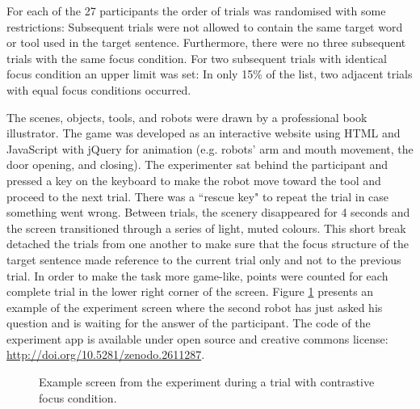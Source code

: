 For each of the 27 participants the order of trials was randomised with some restrictions: Subsequent trials were not allowed to contain the same target word or tool used in the target sentence. Furthermore, there were no three subsequent trials with the same focus condition. For two subsequent trials with identical focus condition an upper limit was set: In only 15\% of the list, two adjacent trials with equal focus conditions occurred.

The scenes, objects, tools, and robots were drawn by a professional book illustrator. The game was developed as an interactive website using HTML and JavaScript with jQuery for animation (e.g. robots' arm and mouth movement, the door opening, and closing). The experimenter sat behind the participant and pressed a key on the keyboard to make the robot move toward the tool and proceed to the next trial. There was a ``rescue key" to repeat the trial in case something went wrong. Between trials, the scenery disappeared for 4 seconds and the screen transitioned through a series of light, muted colours. This short break detached the trials from one another to make sure that the focus structure of the target sentence made reference to the current trial only and not to the previous trial. In order to make the task more game-like, points were counted for each complete trial in the lower right corner of the screen. Figure \ref{fig:exp_trial} presents an example of the experiment screen where the second robot has just asked his question and is waiting for the answer of the participant. The code of the experiment app is available under open source and creative commons license: \href{http://doi.org/10.5281/zenodo.2611287}{http://doi.org/10.5281/zenodo.2611287}.

\begin{figure}[htbp]
\begin{center}
\caption{Example screen from the experiment during a trial with contrastive focus condition.}
\label{fig:exp_trial}
\end{center}
\end{figure}

